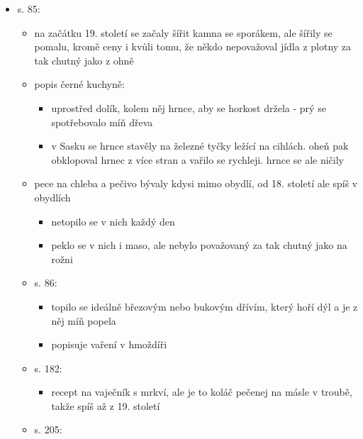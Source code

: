 \begin{itemize}
\begin{itemize}
    \begin{itemize}
    \tightlist
    \item
      předobrazem kremrolí byly štrůdličky z máslovýho těsta, už v roce
      1803 se pekly stejně jako dneska, ale plnily ovocem
    \end{itemize}
  \item
    s. 85:

    \begin{itemize}
    \tightlist
    \item
      na začátku 19. století se začaly šířit kamna se sporákem, ale
      šířily se pomalu, kromě ceny i kvůli tomu, že někdo nepovažoval
      jídla z plotny za tak chutný jako z ohně
    \item
      popis černé kuchyně:

      \begin{itemize}
      \tightlist
      \item
        uprostřed dolík, kolem něj hrnce, aby se horkost držela - prý se
        spotřebovalo míň dřeva
      \item
        v Sasku se hrnce stavěly na železné tyčky ležící na cihlách.
        oheň pak obklopoval hrnec z více stran a vařilo se rychleji.
        hrnce se ale ničily
      \end{itemize}
    \item
      pece na chleba a pečivo bývaly kdysi mimo obydlí, od 18. století
      ale spíš v obydlích

      \begin{itemize}
      \tightlist
      \item
        netopilo se v nich každý den
      \item
        peklo se v nich i maso, ale nebylo považovaný za tak chutný jako
        na rožni
      \end{itemize}
    \item
      s. 86:

      \begin{itemize}
      \tightlist
      \item
        topilo se ideálně březovým nebo bukovým dřívím, který hoří dýl a
        je z něj míň popela
      \item
        popisuje vaření v hmoždíři
      \end{itemize}
    \item
      s. 182:

      \begin{itemize}
      \tightlist
      \item
        recept na vaječník s mrkví, ale je to koláč pečenej na másle v
        troubě, takže spíš až z 19. století
      \end{itemize}
    \item
      s. 205:


\end{itemize}
\end{itemize}
\end{itemize}
